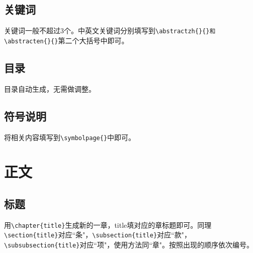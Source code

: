 \documentclass{bucthesis}
\begin{document}
\subsection{关键词}{\par
	关键词一般不超过3个。中英文关键词分别填写到\verb|\abstractzh{}{}和\abstracten{}{}|第二个大括号中即可。}
\subsection{目录}{\par
	目录自动生成，无需做调整。}
\subsection{符号说明}{\par
	将相关内容填写到\verb|\symbolpage{}|中即可。}
\section{正文}
\subsection{标题}{\par
	用\verb|\chapter{title}|生成新的一章，title填对应的章标题即可。同理\verb|\section{title}|对应``条"，\verb|\subsection{title}|对应``款"，\verb|\subsubsection{title}|对应``项"，使用方法同``章"。按照出现的顺序依次编号。}
\end{document}
